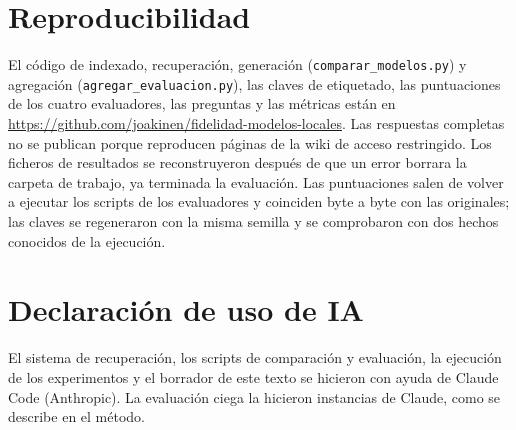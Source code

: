 \documentclass{article}
\newcommand{\REPO}{https://github.com/joakinen/fidelidad-modelos-locales}
\begin{document}
\section*{Reproducibilidad}

El código de indexado, recuperación, generación
(\texttt{comparar\_modelos.py}) y agregación
(\texttt{agregar\_evaluacion.py}), las claves de etiquetado, las
puntuaciones de los cuatro evaluadores, las preguntas y las métricas están
en \url{\REPO}. Las respuestas completas no se publican porque reproducen
páginas de la wiki de acceso restringido.
Los ficheros de resultados se reconstruyeron después de que un error
borrara la carpeta de trabajo, ya terminada la evaluación. Las puntuaciones
salen de volver a ejecutar los scripts de los evaluadores y coinciden byte a
byte con las originales; las claves se regeneraron con la misma semilla y se
comprobaron con dos hechos conocidos de la ejecución.

\section*{Declaración de uso de IA}

El sistema de recuperación, los scripts de comparación y evaluación, la
ejecución de los experimentos y el borrador de este texto se hicieron con
ayuda de Claude Code (Anthropic). La evaluación ciega la hicieron instancias
de Claude, como se describe en el método.
\end{document}
